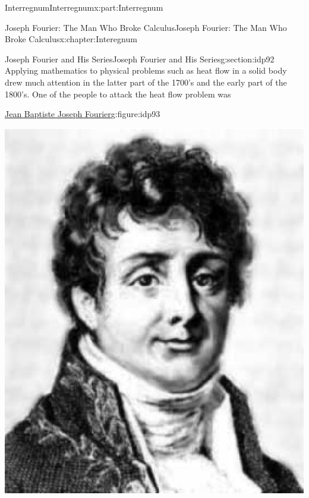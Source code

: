 \documentclass[oneside,10pt,]{book}
\numberwithin{equation}{section}
\begin{document}
\begin{partptx}{Interregnum}{}{Interregnum}{}{}{x:part:Interregnum}
%
\typeout{************************************************}
\typeout{************************************************}
%
\begin{chapterptx}{Joseph Fourier: The Man Who Broke Calculus}{}{Joseph Fourier: The Man Who Broke Calculus}{}{}{x:chapter:Interegnum}
%
%
\typeout{************************************************}
\typeout{************************************************}
%
\begin{sectionptx}{Joseph Fourier and His Series}{}{Joseph Fourier and His Series}{}{}{g:section:idp92}
Applying mathematics to physical problems such as heat flow in a solid body drew much attention in the latter part of the 1700's and the early part of the 1800's. One of the people to attack the heat flow problem was%
\begin{figureptx}{\href{https://mathshistory.st-andrews.ac.uk/Biographies/Fourier/}{Jean Baptiste Joseph Fourier}\protect\footnotemark{}}{g:figure:idp93}{}%
%
\begin{image}{0.325}{0.35}{0.325}%
\includegraphics[width=\linewidth]{images/Fourier.png}

\end{image}
\end{figureptx}
\end{sectionptx}
\end{chapterptx}
\end{partptx}
\end{document}
